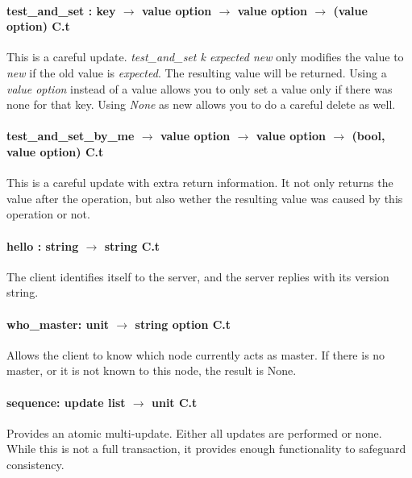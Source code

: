 \paragraph{test\_and\_set : key $\rightarrow$ value option $\rightarrow$ value option $\rightarrow$ (value option) C.t} This is a careful update.
\emph{test\_and\_set k expected new} only modifies the value to \emph{new} if the old value is \emph{expected}.
The resulting value will be returned.
Using a \emph{value option} instead of a value allows you to only set a value only if there was none for that key.
Using \emph{None} as new allows you to do a careful delete as well.
\paragraph{test\_and\_set\_by\_me $\rightarrow$ value option $\rightarrow$ value option $\rightarrow$ (bool, value option) C.t} 
This is a careful update with extra return information. 
It not only returns the value after the operation, 
but also wether the resulting value was caused by this operation or not.
\paragraph{hello : string $\rightarrow$ string C.t}
The client identifies itself to the server, and the server replies with its version string.
\paragraph{who\_master: unit $\rightarrow$ string option C.t}
Allows the client to know which node currently acts as master.
If there is no master, or it is not known to this node, the result is None.
%

\paragraph{sequence: update list $\rightarrow$ unit C.t}
Provides an atomic multi-update. Either all updates are performed or none. 
While this is not a full transaction, it provides enough functionality to safeguard consistency.
